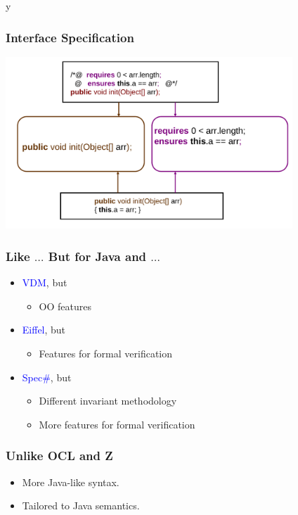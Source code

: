 \if y\MAKEHANDOUTS \documentclass[t,compress,landscape,handout]{beamer}
\begin{document}
\begin{frame}
\frametitle{Interface Specification}
\includegraphics[width=4.25in]{if1}
\end{frame}

\begin{frame}
\frametitle{Like $\ldots$ But for Java and $\ldots$}
\begin{itemize}
\item
\textcolor{blue}{VDM}, but
\begin{itemize}
\item
OO features
\end{itemize}

\item
\textcolor{blue}{Eiffel}, but
\begin{itemize}
\item
Features for formal verification
\end{itemize}

\item
\textcolor{blue}{Spec\#}, but
\begin{itemize}
\item
Different invariant methodology
\item
More features for formal verification
\end{itemize}
\end{itemize}
\end{frame}

\begin{frame}
\frametitle{Unlike OCL and Z}

\begin{itemize}
\item
More Java-like syntax.

\item
Tailored to Java semantics.
\end{itemize}
\end{frame}
\end{document}
